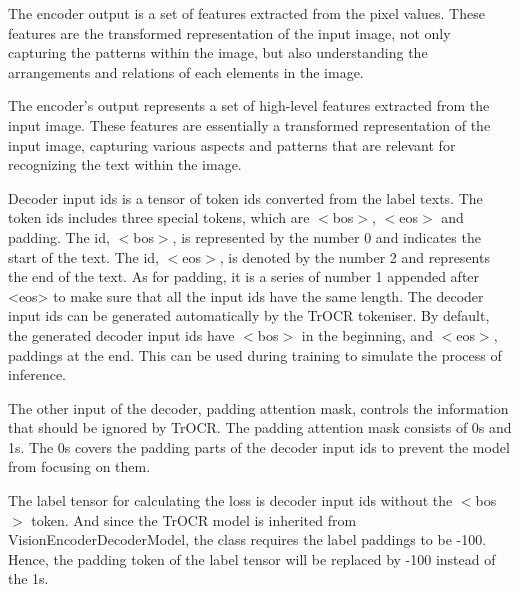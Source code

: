 The encoder output is a set of features extracted from the pixel values. These features are the transformed representation of the input image, not only capturing the patterns within the image, but also understanding the arrangements and relations of each elements in the image.

The encoder's output represents a set of high-level features extracted from the input image. These features are essentially a transformed representation of the input image, capturing various aspects and patterns that are relevant for recognizing the text within the image.

Decoder input ids is a tensor of token ids converted from the label texts. The token ids includes three special tokens, which are $<$bos$>$, $<$eos$>$ and padding. The id, $<$bos$>$, is represented by the number 0 and indicates the start of the text. The id, $<$eos$>$, is denoted by the number 2 and represents the end of the text. As for padding, it is a series of number 1 appended after <eos> to make sure that all the input ids have the same length. The decoder input ids can be generated automatically by the TrOCR tokeniser. By default, the generated decoder input ids have $<$bos$>$ in the beginning, and $<$eos$>$, paddings at the end. This can be used during training to simulate the process of inference. 

The other input of the decoder, padding attention mask, controls the information that should be ignored by TrOCR. The padding attention mask consists of 0s and 1s. The 0s covers the padding parts of the decoder input ids to prevent the model from focusing on them.

The label tensor for calculating the loss is decoder input ids without the $<$bos$>$ token. And since the TrOCR model is inherited from VisionEncoderDecoderModel, the class requires the label paddings to be -100. Hence, the padding token of the label tensor will be replaced by -100 instead of the 1s.

